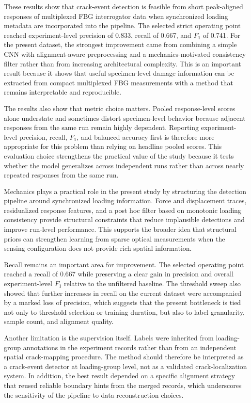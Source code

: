 \documentclass[notspecified,article,submit,pdftex,moreauthors]{Definitions/mdpi}
\begin{document}
These results show that crack-event detection is feasible from short peak-aligned responses of multiplexed FBG interrogator data when synchronized loading metadata are incorporated into the pipeline. The selected strict operating point reached experiment-level precision of 0.833, recall of 0.667, and $F_1$ of 0.741. For the present dataset, the strongest improvement came from combining a simple CNN with alignment-aware preprocessing and a mechanics-motivated consistency filter rather than from increasing architectural complexity. This is an important result because it shows that useful specimen-level damage information can be extracted from compact multiplexed FBG measurements with a method that remains interpretable and reproducible.

The results also show that metric choice matters. Pooled response-level scores alone understate and sometimes distort specimen-level behavior because adjacent responses from the same run remain highly dependent. Reporting experiment-level precision, recall, $F_1$, and balanced accuracy first is therefore more appropriate for this problem than relying on headline pooled scores. This evaluation choice strengthens the practical value of the study because it tests whether the model generalizes across independent runs rather than across nearly repeated responses from the same run.

Mechanics plays a practical role in the present study by structuring the detection pipeline around synchronized loading information. Force and displacement traces, residualized response features, and a post hoc filter based on monotonic loading consistency provide structural constraints that reduce implausible detections and improve run-level performance. This supports the broader idea that structural priors can strengthen learning from sparse optical measurements when the sensing configuration does not provide rich spatial information.

Recall remains an important area for improvement. The selected operating point reached a recall of 0.667 while preserving a clear gain in precision and overall experiment-level $F_1$ relative to the unfiltered baseline. The threshold sweep also showed that further increases in recall on the current dataset were accompanied by a marked loss of precision, which suggests that the present bottleneck is tied not only to threshold selection or training duration, but also to label granularity, sample count, and alignment quality.

Another limitation is the supervision itself. Labels were inherited from loading-group annotations in the experiment records rather than from an independent spatial crack-mapping procedure. The method should therefore be interpreted as a crack-event detector at loading-group level, not as a validated crack-localization system. In addition, the best result depended on a specific alignment strategy that reused reliable boundary hints from the merged records, which underscores the sensitivity of the pipeline to data reconstruction choices.
\end{document}

